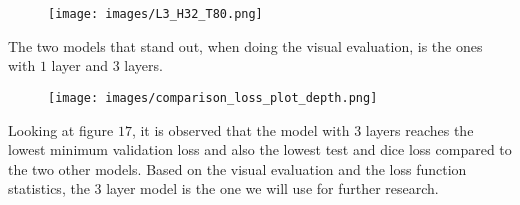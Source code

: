 \documentclass[a4paper,12pt]{article}
\begin{document}
\begin{figure}[H]
  \centering
  \texttt{[image: images/L3\_H32\_T80.png]}
  \caption{} %
  \label{fig:n19}
\end{figure}
The two models that stand out, when doing the visual evaluation, is the ones with $1$ layer and $3$ layers. 
\begin{figure}[H]
  \centering
  \texttt{[image: images/comparison\_loss\_plot\_depth.png]}
  \caption{} %
  \label{fig:n20}
\end{figure}
Looking at figure $17$, it is observed that the model with $3$ layers reaches the lowest minimum validation loss and also the lowest test and dice loss compared to the two other models. Based on the visual evaluation and the loss function statistics, the $3$ layer model is the one we will use for further research.
\end{document}
